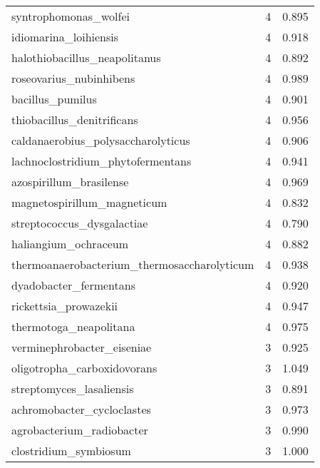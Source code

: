 \begin{tabular}{lrr}
                       syntrophomonas\_wolfei &                   4 &     0.895 \\
                       idiomarina\_loihiensis &                   4 &     0.918 \\
               halothiobacillus\_neapolitanus &                   4 &     0.892 \\
                     roseovarius\_nubinhibens &                   4 &     0.989 \\
                            bacillus\_pumilus &                   4 &     0.901 \\
                  thiobacillus\_denitrificans &                   4 &     0.956 \\
          caldanaerobius\_polysaccharolyticus &                   4 &     0.906 \\
           lachnoclostridium\_phytofermentans &                   4 &     0.941 \\
                     azospirillum\_brasilense &                   4 &     0.969 \\
                 magnetospirillum\_magneticum &                   4 &     0.832 \\
                  streptococcus\_dysgalactiae &                   4 &     0.790 \\
                        haliangium\_ochraceum &                   4 &     0.882 \\
 thermoanaerobacterium\_thermosaccharolyticum &                   4 &     0.938 \\
                      dyadobacter\_fermentans &                   4 &     0.920 \\
                       rickettsia\_prowazekii &                   4 &     0.947 \\
                      thermotoga\_neapolitana &                   4 &     0.975 \\
                  verminephrobacter\_eiseniae &                   3 &     0.925 \\
                 oligotropha\_carboxidovorans &                   3 &     1.049 \\
                    streptomyces\_lasaliensis &                   3 &     0.891 \\
                  achromobacter\_cycloclastes &                   3 &     0.973 \\
                   agrobacterium\_radiobacter &                   3 &     0.990 \\
                       clostridium\_symbiosum &                   3 &     1.000 \\

\end{tabular}
